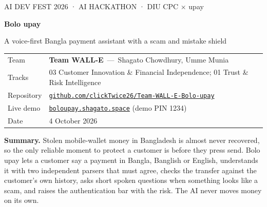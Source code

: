 \documentclass[11pt,a4paper]{article}
\begin{document}
\thispagestyle{first}

{\sffamily\footnotesize\color{muted} AI DEV FEST 2026 \;·\; AI HACKATHON \;·\; DIU CPC $\times$ upay}\par\vspace{6pt}
{\sffamily\bfseries\fontsize{26}{30}\selectfont Bolo upay}\par\vspace{2pt}
{\sffamily\large\color{muted} A voice-first Bangla payment assistant with a scam and mistake shield}\par\vspace{10pt}

\begin{tabularx}{\textwidth}{@{}l X@{}}
\sffamily\small\color{muted} Team & \small \textbf{Team WALL-E} \,—\, Shagato Chowdhury, Umme Munia\\
\sffamily\small\color{muted} Tracks & \small 03 Customer Innovation \& Financial Independence; 01 Trust \& Risk Intelligence\\
\sffamily\small\color{muted} Repository & \small \href{https://github.com/clickTwice26/Team-WALL-E-Bolo-upay}{\texttt{github.com/clickTwice26/Team-WALL-E-Bolo-upay}}\\
\sffamily\small\color{muted} Live demo & \small \href{https://boloupay.shagato.space}{\texttt{boloupay.shagato.space}} \;(demo PIN 1234)\\
\sffamily\small\color{muted} Date & \small 4 October 2026\\
\end{tabularx}

\vspace{10pt}

\begin{minipage}{\textwidth}
\textbf{Summary.} Stolen mobile-wallet money in Bangladesh is almost never recovered, so the only reliable moment to protect a customer is before they press send. Bolo upay lets a customer say a payment in Bangla, Banglish or English, understands it with two independent parsers that must agree, checks the transfer against the customer's own history, asks short spoken questions when something looks like a scam, and raises the authentication bar with the risk. The AI never moves money on its own.
\end{minipage}
\end{document}
